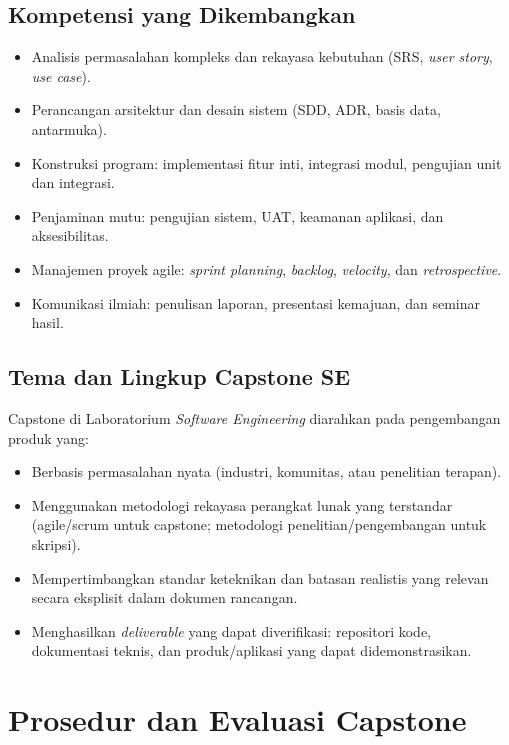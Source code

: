 \documentclass[12pt,a4paper]{report}
\begin{document}
\section{Kompetensi yang Dikembangkan}
\begin{itemize}
\item Analisis permasalahan kompleks dan rekayasa kebutuhan (SRS, \emph{user story}, \emph{use case}).
\item Perancangan arsitektur dan desain sistem (SDD, ADR, basis data, antarmuka).
\item Konstruksi program: implementasi fitur inti, integrasi modul, pengujian unit dan integrasi.
\item Penjaminan mutu: pengujian sistem, UAT, keamanan aplikasi, dan aksesibilitas.
\item Manajemen proyek agile: \emph{sprint planning}, \emph{backlog}, \emph{velocity}, dan \emph{retrospective}.
\item Komunikasi ilmiah: penulisan laporan, presentasi kemajuan, dan seminar hasil.
\end{itemize}

\section{Tema dan Lingkup Capstone SE}
Capstone di Laboratorium \emph{Software Engineering} diarahkan pada pengembangan produk yang:
\begin{itemize}
\item Berbasis permasalahan nyata (industri, komunitas, atau penelitian terapan).
\item Menggunakan metodologi rekayasa perangkat lunak yang terstandar (agile/scrum untuk capstone; metodologi penelitian/pengembangan untuk skripsi).
\item Mempertimbangkan standar keteknikan dan batasan realistis yang relevan secara eksplisit dalam dokumen rancangan.
\item Menghasilkan \emph{deliverable} yang dapat diverifikasi: repositori kode, dokumentasi teknis, dan produk/aplikasi yang dapat didemonstrasikan.
\end{itemize}

\chapter{Prosedur dan Evaluasi Capstone}
\end{document}
